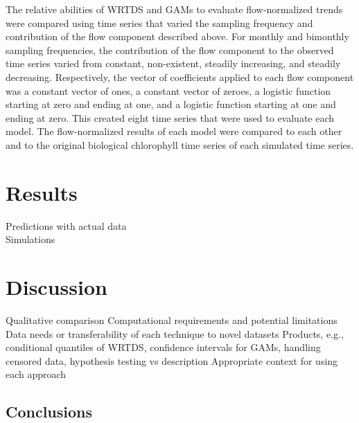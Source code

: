 \documentclass[letterpaper,12pt,oneside]{article}\usepackage[]{graphicx}\usepackage[]{color}
\begin{document}
The relative abilities of \ac{WRTDS} and \acp{GAM} to evaluate flow-normalized trends were compared using time series that varied the sampling frequency and contribution of the flow component described above.  For monthly and bimonthly sampling frequencies, the contribution of the flow component to the observed time series varied from constant, non-existent, steadily increasing, and steadily decreasing.  Respectively, the vector of coefficients applied to each flow component was a constant vector of ones, a constant vector of zeroes, a logistic function starting at zero and ending at one, and a logistic function starting at one and ending at zero.  This created eight time series that were used to evaluate each model.  The flow-normalized results of each model were compared to each other and to the original biological chlorophyll time series of each simulated time series.   

\section{Results}

\begin{outline}
\0 \noindent Predictions with actual data \\
\0 \noindent Simulations
\end{outline}

\section{Discussion}

\begin{outline}
\0 \noindent Qualitative comparison
\1 Computational requirements and potential limitations
\1 Data needs or transferability of each technique to novel datasets
\1 Products, e.g., conditional quantiles of \ac{WRTDS}, confidence intervals for \acp{GAM}, handling censored data, hypothesis testing vs description
\1 Appropriate context for using each approach
\end{outline}

\subsection{Conclusions}

\clearpage
\begin{singlespace}


\end{singlespace}
\clearpage
\end{document}
